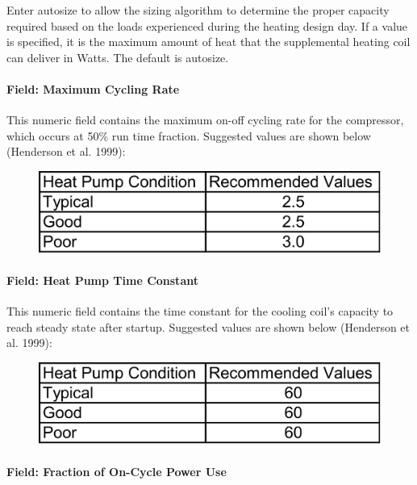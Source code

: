 Enter autosize to allow the sizing algorithm to determine the proper capacity required based on the loads experienced during the heating design day. If a value is specified, it is the maximum amount of heat that the supplemental heating coil can deliver in Watts. The default is autosize.

\paragraph{Field: Maximum Cycling Rate}\label{field-maximum-cycling-rate-000}

This numeric field contains the maximum on-off cycling rate for the compressor, which occurs at 50\% run time fraction. Suggested values are shown below (Henderson et al. 1999):

\begin{figure}[htbp]
\centering
\includegraphics{media/image605.png}
\caption{}
\end{figure}

\paragraph{Field: Heat Pump Time Constant}\label{field-heat-pump-time-constant}

This numeric field contains the time constant for the cooling coil's capacity to reach steady state after startup. Suggested values are shown below (Henderson et al. 1999):

\begin{figure}[htbp]
\centering
\includegraphics{media/image606.png}
\caption{}
\end{figure}

\paragraph{Field: Fraction of On-Cycle Power Use}\label{field-fraction-of-on-cycle-power-use}

